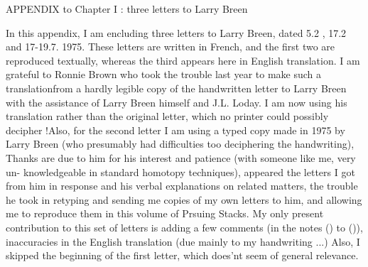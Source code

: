 
APPENDIX to Chapter I : three letters to Larry Breen

 In this appendix, I am encluding three letters to Larry Breen, dated
5.2 , 17.2 and 17-19.7. 1975. These letters are written in French, and
the first two are reproduced textually, whereas the third appears here in
English translation. I am grateful to Ronnie Brown who took the trouble
last year to make such a translation\hand{(}from a hardly legible  copy of
the handwritten letter to Larry Breen\hand{)} with the assistance of Larry Breen
himself and J.L. Loday. I am now using his translation rather than the
original letter, which no printer could possibly decipher !\hand{/}Also, for the
second letter I am using a typed copy made in 1975 by Larry Breen (who
presumably had difficulties too deciphering the handwriting), Thanks are
due to him for his interest and patience (with someone like me, very un-%
knowledgeable in standard homotopy techniques),  appeared  the
letters I got from him in response and his verbal explanations on related
matters, the trouble he took in  retyping  and sending me copies of
my own letters to him, and allowing me to reproduce them in this volume
of Prsuing Stacks. My only present contribution to this set of letters is
adding a few comments (in the notes () to ()),  
inaccuracies in the English translation (due mainly to my handwriting ...)
Also, I skipped the beginning of the first letter, which does'nt seem 
 of general relevance.

